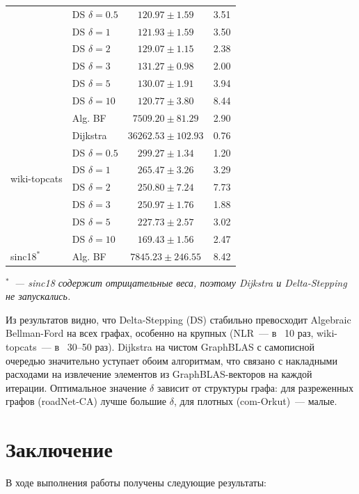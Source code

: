 \documentclass[a4paper]{article}
\begin{document}
\begin{table}[h!]
\begin{minipage}{0.48\textwidth}
\begin{tabular}{llcc}
    & DS $\delta=0.5$ & $120.97 \pm 1.59$ & 3.51 \\
    & DS $\delta=1$ & $121.93 \pm 1.59$ & 3.50 \\
    & DS $\delta=2$ & $129.07 \pm 1.15$ & 2.38 \\
    & DS $\delta=3$ & $131.27 \pm 0.98$ & 2.00 \\
    & DS $\delta=5$ & $130.07 \pm 1.91$ & 3.94 \\
    & DS $\delta=10$ & $120.77 \pm 3.80$ & 8.44 \\
\midrule
\multirow{8}{*}{wiki-topcats}
    & Alg. BF & $7509.20 \pm 81.29$ & 2.90 \\
    & Dijkstra & $36262.53 \pm 102.93$ & 0.76 \\
    & DS $\delta=0.5$ & $299.27 \pm 1.34$ & 1.20 \\
    & DS $\delta=1$ & $265.47 \pm 3.26$ & 3.29 \\
    & DS $\delta=2$ & $250.80 \pm 7.24$ & 7.73 \\
    & DS $\delta=3$ & $250.97 \pm 1.76$ & 1.88 \\
    & DS $\delta=5$ & $227.73 \pm 2.57$ & 3.02 \\
    & DS $\delta=10$ & $169.43 \pm 1.56$ & 2.47 \\
\midrule
\multirow{1}{*}{sinc18$^*$}
    & Alg. BF & $7845.23 \pm 246.55$ & 8.42 \\
\bottomrule
\end{tabular}
\smallskip

\noindent\emph{$^*$~--- sinc18 содержит отрицательные веса, поэтому Dijkstra и Delta-Stepping не запускались.}
\end{minipage}
\end{table}

Из результатов видно, что Delta-Stepping (DS) стабильно превосходит Algebraic Bellman-Ford
на всех графах, особенно на крупных (NLR~--- в ~10 раз, wiki-topcats~--- в ~30--50 раз).
Dijkstra на чистом GraphBLAS с самописной очередью значительно уступает обоим
алгоритмам, что связано с накладными расходами на извлечение элементов из
GraphBLAS-векторов на каждой итерации. Оптимальное значение $\delta$ зависит от
структуры графа: для разреженных графов (roadNet-CA) лучше большие $\delta$,
для плотных (com-Orkut)~--- малые.

\section{Заключение}

В ходе выполнения работы получены следующие результаты:
\end{document}
